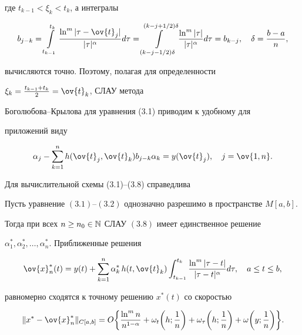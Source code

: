 где $t_{k-1}<\xi_k<t_k$, а интегралы


\begin{equation}


b_{j-k}=\int\limits_{t_{k-1}}^{t_k}\frac{\ln^m|\tau -\ov{t}_j|}


{|\tau |^\alpha}d\tau =\int\limits_{(k-j-1/2)\delta}^{(k-j+1/2)\delta}


\frac{\ln^m|\tau |}{|\tau |^\alpha}d\tau =b_{k-j},\quad \delta=\frac{b-a}{n},


\end{equation}


вычисляются точно. Поэтому, полагая для определенности


$\xi_k=\frac{t_{k-1}+t_k}{2}=\ov{t}_k$, СЛАУ метода


Боголюбова--Крылова для уравнения (3.1) приводим к удобному для


приложений виду


\begin{equation}


\alpha_j-\sum_{k=1}^nh(\ov{t}_j,\ov{t}_k)b_{j-k}\alpha_k=


y(\ov{t}_j),\quad j=\ov{1,n}.


\end{equation}





Для вычислительной схемы (3.1)--(3.8) справедлива





\begin{thms}


Пусть уравнение $(3.1)$--$(3.2)$ однозначно разрешимо в пространстве $M[a,b]$.


Тогда при всех $n\geq n_0\in \Bbb N$ СЛАУ $(3.8)$ имеет единственное решение


$\alpha_1^*,\alpha_2^*,\dotsc ,\alpha_n^*$. Приближенные решения


\begin{equation}


\ov{x}_n^*(t)=y(t)+\sum_{k=1}^n\alpha_k^*\, h(t,\ov{t}_k)


\intl_{t_{k-1}}^{t_k}\frac{\ln ^m|\tau -t|}{|\tau -t|^\alpha}d\tau,


\quad a\leq t\leq b,


\end{equation}


равномерно сходятся к точному решению $x^*(t)$ со скоростью


\begin{equation}


\|x^*-\ov{x}_n^*\|_{C[a,b]}=O\bigg\{\frac{\ln ^mn}{n^{1-\alpha}}+


\omega_t\bigg(h;\frac{1}{n}\bigg) +\omega_\tau\bigg(h;\frac{1}{n}\bigg)


+\omega\bigg(y;\frac{1}{n}\bigg)\bigg\}.


\end{equation}


\end{thms}





